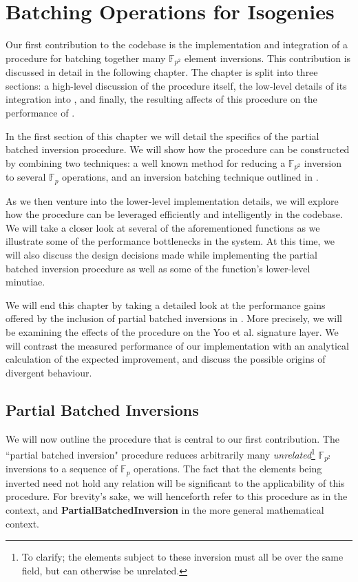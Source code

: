 \chapter{Batching Operations for Isogenies}
\label{sec:batching}

Our first contribution to the \sidh codebase is the implementation and integration of a procedure for batching together many $\mathbb{F}_{p^2}$ element inversions. This contribution is discussed in detail in the following chapter. The chapter is split into three sections: a high-level discussion of the procedure itself, the low-level details of its integration into \sidh, and finally, the resulting affects of this procedure on the performance of \sidh. 

In the first section of this chapter we will detail the specifics of the partial batched inversion procedure. We will show how the procedure can be constructed by combining two techniques: a well known method for reducing a $\mathbb{F}_{p^2}$ inversion to several $\mathbb{F}_{p}$ operations, and an inversion batching technique outlined in \cite{batching}. 

As we then venture into the lower-level implementation details, we will explore how the procedure can be leveraged efficiently and intelligently in the codebase. We will take a closer look at several of the aforementioned \sidh functions as we illustrate some of the performance bottlenecks in the system. At this time, we will also discuss the design decisions made while implementing the partial batched inversion procedure as well as some of the function's lower-level minutiae.

We will end this chapter by taking a detailed look at the performance gains offered by the inclusion of partial batched inversions in \sidh. More precisely, we will be examining the effects of the procedure on the Yoo et al. signature layer. We will contrast the measured performance of our implementation with an analytical calculation of the expected improvement, and discuss the possible origins of divergent behaviour.  

\section{Partial Batched Inversions}
\label{sec:pbi}

We will now outline the procedure that is central to our first contribution. The ``partial batched inversion" procedure reduces arbitrarily many \emph{unrelated}\footnote{To clarify; the elements subject to these inversion must all be over the same field, but can otherwise be unrelated.} $\mathbb{F}_{p^{2}}$ inversions to a sequence of $\mathbb{F}_{p}$ operations. The fact that the elements being inverted need not hold any relation will be significant to the applicability of this procedure. For brevity's sake, we will henceforth refer to this procedure as  in the \sidh context, and \textbf{PartialBatchedInversion} in the more general mathematical context.

